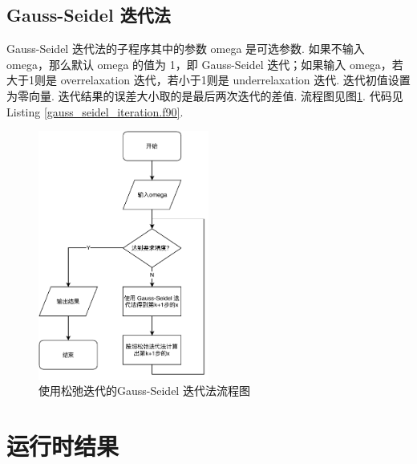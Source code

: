 \documentclass{article}
\begin{document}
	\subsection{Gauss-Seidel 迭代法}
	Gauss-Seidel 迭代法的子程序其中的参数 omega 是可选参数. 如果不输入 omega，那么默认 omega 的值为 1，即 Gauss-Seidel 迭代；如果输入 omega，若大于1则是 overrelaxation 迭代，若小于1则是 underrelaxation 迭代. 迭代初值设置为零向量. 迭代结果的误差大小取的是最后两次迭代的差值. 流程图见图\ref{fig:gs}. 代码见 Listing \ref{gauss_seidel_iteration.f90}.
	\begin{figure}[h!tb]
		\centering
		\includegraphics[width=0.5\textwidth]{./utils/gs.pdf}
		\caption{ 使用松弛迭代的Gauss-Seidel 迭代法流程图\label{fig:gs}}
	\end{figure}
	
	
	\section{运行时结果}
\end{document}
